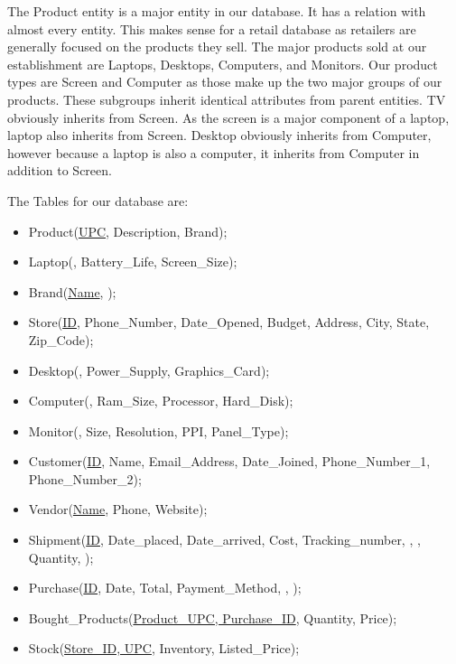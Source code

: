 \documentclass{article}
\begin{document}
    The Product entity is a major entity in our database. It has a relation with almost every
    entity. This makes sense for a retail database as retailers are generally focused on the
    products they sell. The major products sold at our establishment are Laptops, Desktops,
    Computers, and Monitors. Our product types are Screen and Computer as those make up the two
    major groups of our products. These subgroups inherit identical attributes from parent
    entities. TV obviously inherits from Screen. As the screen is a major component of a
    laptop, laptop also inherits from Screen.  Desktop obviously inherits from Computer,
    however because a laptop is also a computer, it inherits from Computer in addition to
    Screen.

		\noindent 
		The Tables for our database are:
		\begin{itemize}
			\item Product(\underline{UPC}, Description, Brand);
			\item Laptop(, Battery\_Life, Screen\_Size);
      \item Brand(\underline{Name}, );
      \item Store(\underline{ID}, Phone\_Number, Date\_Opened, Budget, Address, City, State, Zip\_Code);
			\item Desktop(, Power\_Supply, Graphics\_Card);
			\item Computer(, Ram\_Size, Processor, Hard\_Disk);
      \item Monitor(, Size, Resolution, PPI, Panel\_Type);
			\item Customer(\underline{ID}, Name, Email\_Address, Date\_Joined, Phone\_Number\_1, Phone\_Number\_2);
			\item Vendor(\underline{Name}, Phone, Website);
      \item Shipment(\underline{ID}, Date\_placed, Date\_arrived, Cost, Tracking\_number,
        , , Quantity, );
      \item Purchase(\underline{ID}, Date, Total, Payment\_Method, , );
      \item Bought\_Products(\underline{Product\_UPC, Purchase\_ID}, Quantity, Price);
      \item Stock(\underline{Store\_ID, UPC}, Inventory, Listed\_Price);
		\end{itemize}
\end{document}

